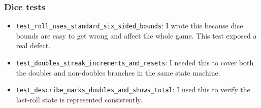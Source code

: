 \documentclass[12pt]{article}
\begin{document}
\subsubsection*{Dice tests}
\begin{itemize}
  \item \texttt{test\_roll\_uses\_standard\_six\_sided\_bounds}: I wrote this because dice bounds are easy to get wrong and affect the whole game. This test exposed a real defect.
  \item \texttt{test\_doubles\_streak\_increments\_and\_resets}: I needed this to cover both the doubles and non-doubles branches in the same state machine.
  \item \texttt{test\_describe\_marks\_doubles\_and\_shows\_total}: I used this to verify the last-roll state is represented consistently.
\end{itemize}
\end{document}
